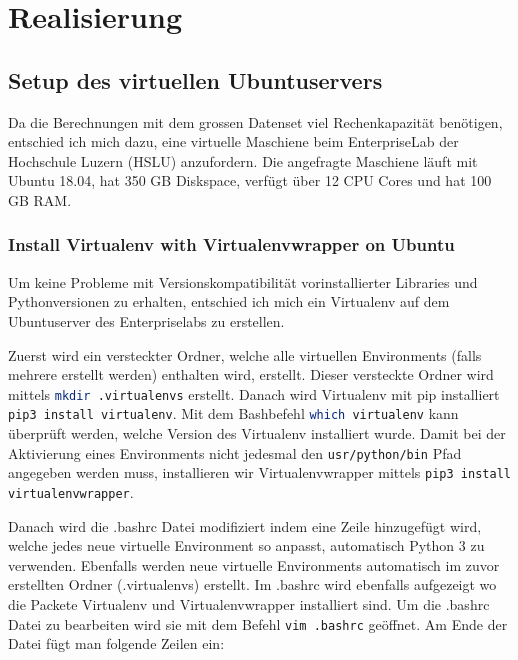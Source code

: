 \chapter{Realisierung}


\section{Setup des virtuellen Ubuntuservers}
Da die Berechnungen mit dem grossen Datenset viel Rechenkapazität benötigen, entschied ich mich dazu, eine virtuelle Maschiene beim EnterpriseLab der Hochschule Luzern (HSLU) anzufordern. Die angefragte Maschiene läuft mit Ubuntu 18.04, hat 350 GB Diskspace, verfügt über 12 CPU Cores und hat 100 GB RAM. 

\subsection{Install Virtualenv with Virtualenvwrapper on Ubuntu}
Um keine Probleme mit Versionskompatibilität vorinstallierter Libraries und Pythonversionen zu erhalten, entschied ich mich ein Virtualenv auf dem Ubuntuserver des Enterpriselabs zu erstellen.

Zuerst wird ein versteckter Ordner, welche alle virtuellen Environments (falls mehrere erstellt werden) enthalten wird, erstellt. Dieser versteckte Ordner wird mittels \lstinline[language=Bash]{mkdir .virtualenvs} erstellt.
Danach wird Virtualenv mit pip installiert \lstinline[language=bash]{pip3 install virtualenv}. Mit dem Bashbefehl \lstinline[language=bash]{which virtualenv} kann überprüft werden, welche Version des Virtualenv installiert wurde. Damit bei der Aktivierung eines Environments nicht jedesmal den \lstinline[language=bash]{usr/python/bin} Pfad angegeben werden muss, installieren wir Virtualenvwrapper mittels \lstinline[language=bash]{pip3 install virtualenvwrapper}.

Danach wird die .bashrc Datei modifiziert indem eine Zeile hinzugefügt wird, welche jedes neue virtuelle Environment so anpasst, automatisch Python 3 zu verwenden. Ebenfalls werden neue virtuelle Environments automatisch im zuvor erstellten Ordner (.virtualenvs) erstellt. Im .bashrc wird ebenfalls aufgezeigt wo die Packete Virtualenv und Virtualenvwrapper installiert sind. Um die .bashrc Datei zu bearbeiten wird sie mit dem Befehl \lstinline[language=bash]{vim .bashrc} geöffnet. Am Ende der Datei fügt man folgende Zeilen ein: 


